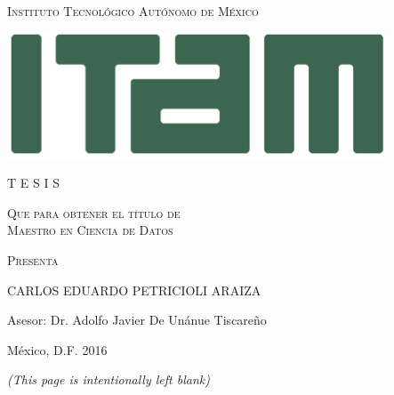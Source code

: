 \thispagestyle{empty}
\begin{center}
\LARGE \scshape Instituto Tecnológico Autónomo de México \\
\end{center}

\vspace{4mm}



\begin{center}
\includegraphics[scale=.7]{../img/ITAM.jpg}


\vspace{15mm}


\scshape \Large \thetitle

\vfill
\scshape \large T E S I S 


\vspace{3mm}
\scshape Que para obtener el título de \\

\vspace{3mm}
\scshape Maestro en Ciencia de Datos

\vspace{3mm}
\scshape Presenta

\vspace{4mm}
\Large CARLOS EDUARDO PETRICIOLI ARAIZA


\vspace{5mm}

\large Asesor: Dr.  Adolfo Javier De Unánue Tiscareño
\end{center}
\vspace{10mm}
México, D.F.   \hfill       2016


\newpage

\thispagestyle{empty}

\begin{flushright}
\textit{(This page is intentionally left blank)}
\end{flushright}

\newpage
\thispagestyle{plain}
\setcounter{page}{1}

